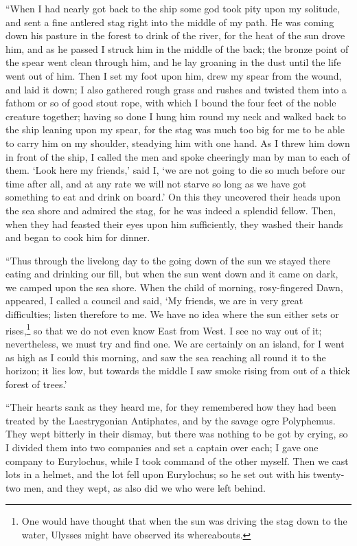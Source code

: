 “When I had nearly got back to the ship some god took pity upon my solitude,
and sent a fine antlered stag right into the middle of my path. He was coming
down his pasture in the forest to drink of the river, for the heat of the sun
drove him, and as he passed I struck him in the middle of the back; the bronze
point of the spear went clean through him, and he lay groaning in the dust
until the life went out of him. Then I set my foot upon him, drew my spear from
the wound, and laid it down; I also gathered rough grass and rushes and twisted
them into a fathom or so of good stout rope, with which I bound the four feet
of the noble creature together; having so done I hung him round my neck and
walked back to the ship leaning upon my spear, for the stag was much too big
for me to be able to carry him on my shoulder, steadying him with one hand. As
I threw him down in front of the ship, I called the men and spoke cheeringly
man by man to each of them. ‘Look here my friends,’ said I, ‘we are not going
to die so much before our time after all, and at any rate we will not starve so
long as we have got something to eat and drink on board.’ On this they
uncovered their heads upon the sea shore and admired the stag, for he was
indeed a splendid fellow. Then, when they had feasted their eyes upon him
sufficiently, they washed their hands and began to cook him for dinner.

“Thus through the livelong day to the going down of the sun we stayed there
eating and drinking our fill, but when the sun went down and it came on dark,
we camped upon the sea shore. When the child of morning, rosy-fingered Dawn,
appeared, I called a council and said, ‘My friends, we are in very great
difficulties; listen therefore to me. We have no idea where the sun either sets
or rises,\footnote{One would have thought that when the sun was driving the stag down to the
water, Ulysses might have observed its whereabouts.} so
that we do not even know East from West. I see no way out of it; nevertheless,
we must try and find one. We are certainly on an island, for I went as high as
I could this morning, and saw the sea reaching all round it to the horizon; it
lies low, but towards the middle I saw smoke rising from out of a thick forest
of trees.’

“Their hearts sank as they heard me, for they remembered how they had been
treated by the Laestrygonian Antiphates, and by the savage ogre Polyphemus.
They wept bitterly in their dismay, but there was nothing to be got by crying,
so I divided them into two companies and set a captain over each; I gave one
company to Eurylochus, while I took command of the other myself. Then we cast
lots in a helmet, and the lot fell upon Eurylochus; so he set out with his
twenty-two men, and they wept, as also did we who were left behind.

